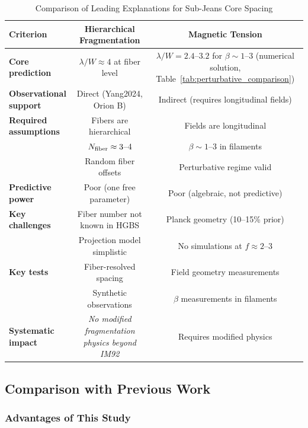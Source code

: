 \documentclass[11pt,a4paper]{article}
\begin{document}
\begin{table}[H]
\centering
\caption{Comparison of Leading Explanations for Sub-Jeans Core Spacing}
\label{tab:comparison}
\small
\begin{tabular}{lcc}
\toprule
Criterion & Hierarchical Fragmentation & Magnetic Tension \\
\midrule
\textbf{Core prediction} & $\lambda/W \approx 4$ at fiber level & $\lambda/W = 2.4$--$3.2$ for $\beta \sim 1$--$3$ (numerical solution, Table~\ref{tab:perturbative_comparison}) \\
\textbf{Observational support} & Direct (Yang2024, Orion B) & Indirect (requires longitudinal fields) \\
\textbf{Required assumptions} & Fibers are hierarchical & Fields are longitudinal \\
& $N_{\rm fiber} \approx 3$--$4$ & $\beta \sim 1$--$3$ in filaments \\
& Random fiber offsets & Perturbative regime valid \\
\textbf{Predictive power} & Poor (one free parameter) & Poor (algebraic, not predictive) \\
\textbf{Key challenges} & Fiber number not known in HGBS & Planck geometry (10--15\% prior) \\
& Projection model simplistic & No simulations at $f \approx 2$--$3$ \\
\textbf{Key tests} & Fiber-resolved spacing & Field geometry measurements \\
& Synthetic observations & $\beta$ measurements in filaments \\
\textbf{Systematic impact} & \textit{No modified fragmentation physics beyond IM92} & Requires modified physics \\
\bottomrule
\end{tabular}
\end{table}

\subsection{Comparison with Previous Work}

\subsubsection{Advantages of This Study}
\end{document}
